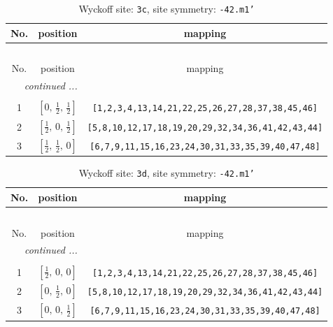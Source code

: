 \documentclass[fleqn,8pt]{jsarticle}
\begin{document}
\renewcommand{\arraystretch}{1.2}
\begin{longtable}{ccc}
\caption{Wyckoff site: {\tt 3c}, site symmetry: {\tt -42.m1'}}
 \\
 \hline \hline
No. & position & mapping \\ \hline \endfirsthead

\multicolumn{2}{l}{\tablename\ \thetable{}} \\
 \hline \hline
No. & position & mapping \\ \hline \endhead

 \hline \hline
\multicolumn{2}{r}{\footnotesize\it continued ...} \\ \endfoot

 \hline \hline
\multicolumn{2}{r}{} \\ \endlastfoot

1 & $\left[ 0,\, \frac{1}{2},\, \frac{1}{2} \right]$ & {\tt [1,2,3,4,13,14,21,22,25,26,27,28,37,38,45,46]} \\ \hline
2 & $\left[ \frac{1}{2},\, 0,\, \frac{1}{2} \right]$ & {\tt [5,8,10,12,17,18,19,20,29,32,34,36,41,42,43,44]} \\ \hline
3 & $\left[ \frac{1}{2},\, \frac{1}{2},\, 0 \right]$ & {\tt [6,7,9,11,15,16,23,24,30,31,33,35,39,40,47,48]} \\
\end{longtable}
\renewcommand{\arraystretch}{1.2}
\begin{longtable}{ccc}
\caption{Wyckoff site: {\tt 3d}, site symmetry: {\tt -42.m1'}}
 \\
 \hline \hline
No. & position & mapping \\ \hline \endfirsthead

\multicolumn{2}{l}{\tablename\ \thetable{}} \\
 \hline \hline
No. & position & mapping \\ \hline \endhead

 \hline \hline
\multicolumn{2}{r}{\footnotesize\it continued ...} \\ \endfoot

 \hline \hline
\multicolumn{2}{r}{} \\ \endlastfoot

1 & $\left[ \frac{1}{2},\, 0,\, 0 \right]$ & {\tt [1,2,3,4,13,14,21,22,25,26,27,28,37,38,45,46]} \\ \hline
2 & $\left[ 0,\, \frac{1}{2},\, 0 \right]$ & {\tt [5,8,10,12,17,18,19,20,29,32,34,36,41,42,43,44]} \\ \hline
3 & $\left[ 0,\, 0,\, \frac{1}{2} \right]$ & {\tt [6,7,9,11,15,16,23,24,30,31,33,35,39,40,47,48]} \\
\end{longtable}
\end{document}
